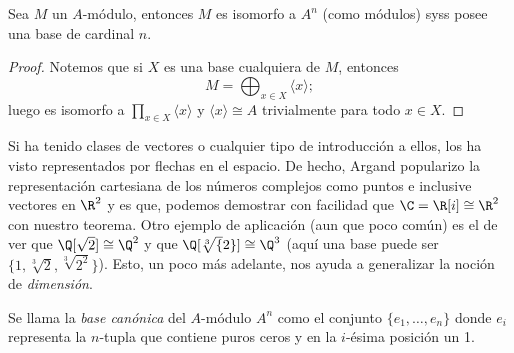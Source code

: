 \documentclass[11pt,oneside]{book}
\begin{document}
\begin{thm}
Sea $M$ un $A$-módulo, entonces $M$ es isomorfo a $A^n$ (como módulos) syss posee una base de cardinal $n$.
\end{thm}
\begin{proof}
Notemos que si $X$ es una base cualquiera de $M$, entonces
$$M=\bigoplus_{x\in X}\langle x\rangle;$$
luego es isomorfo a $\prod_{x\in X}\langle x\rangle$ y $\langle x\rangle\cong A$ trivialmente para todo $x\in X$.
\end{proof}
Si ha tenido clases de vectores o cualquier tipo de introducción a ellos, los ha visto representados por flechas en el espacio. De hecho, Argand popularizo la representación cartesiana de los números complejos como puntos e inclusive vectores en $\R^2$ y es que, podemos demostrar con facilidad que $\C=\R[i]\cong\R^2$ con nuestro teorema. Otro ejemplo de aplicación (aun que poco común) es el de ver que $\Q[\sqrt{2}]\cong\Q^2$ y que $\Q[\sqrt[3]{2}]\cong\Q^3$ (aquí una base puede ser $\{1,\sqrt[3]{2},\sqrt[3]{2^2}\}$). Esto, un poco más adelante, nos ayuda a generalizar la noción de \textit{dimensión}.

Se llama la \textit{base canónica} del $A$-módulo $A^n$ como el conjunto $\{e_1,\dots,e_n\}$ donde $e_i$ representa la $n$-tupla que contiene puros ceros y en la $i$-ésima posición un 1.
\end{document}
